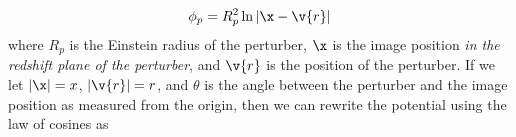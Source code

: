 \begin{equation}
\phi_p = R_p^2 \ln \left| \x - \v{r} \right| 
\end{equation}
where $R_p$ is the Einstein radius of the perturber, $\x$ is the image position \textit{in the redshift plane of the perturber}, and $\v{r}$ is the position of the perturber. If we let $|\x| = x$, $|\v{r}| = r$, and $\theta$ is the angle between the perturber and the image position as measured from the origin, then we can rewrite the potential using the law of cosines as
  
  